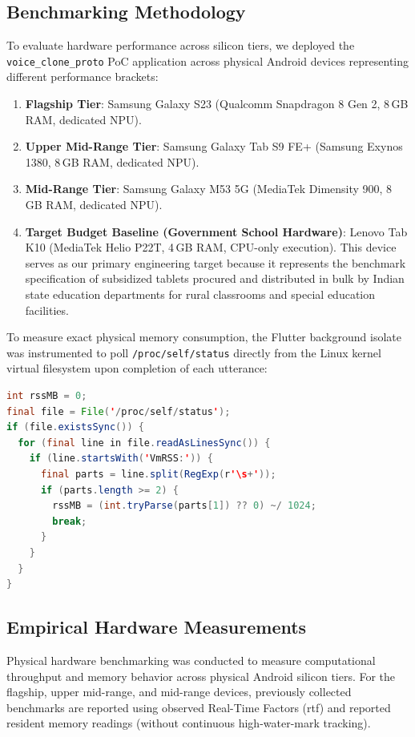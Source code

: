 \subsection{Benchmarking Methodology}
To evaluate hardware performance across silicon tiers, we deployed the \texttt{voice\_clone\_proto} PoC application across physical Android devices representing different performance brackets:
\begin{enumerate}
    \item \textbf{Flagship Tier}: Samsung Galaxy S23 (Qualcomm Snapdragon 8 Gen 2, 8\,GB RAM, dedicated NPU).
    \item \textbf{Upper Mid-Range Tier}: Samsung Galaxy Tab S9 FE+ (Samsung Exynos 1380, 8\,GB RAM, dedicated NPU).
    \item \textbf{Mid-Range Tier}: Samsung Galaxy M53 5G (MediaTek Dimensity 900, 8\,GB RAM, dedicated NPU).
    \item \textbf{Target Budget Baseline (Government School Hardware)}: Lenovo Tab K10 (MediaTek Helio P22T, 4\,GB RAM, CPU-only execution). This device serves as our primary engineering target because it represents the benchmark specification of subsidized tablets procured and distributed in bulk by Indian state education departments for rural classrooms and special education facilities.
\end{enumerate}

To measure exact physical memory consumption, the Flutter background isolate was instrumented to poll \texttt{/proc/self/status} directly from the Linux kernel virtual filesystem upon completion of each utterance:
\begin{lstlisting}[language=Java,caption={Dart In-Kernel Memory Profiling Hook via /proc/self/status}]
int rssMB = 0;
final file = File('/proc/self/status');
if (file.existsSync()) {
  for (final line in file.readAsLinesSync()) {
    if (line.startsWith('VmRSS:')) {
      final parts = line.split(RegExp(r'\s+'));
      if (parts.length >= 2) {
        rssMB = (int.tryParse(parts[1]) ?? 0) ~/ 1024;
        break;
      }
    }
  }
}
\end{lstlisting}

\subsection{Empirical Hardware Measurements}
Physical hardware benchmarking was conducted to measure computational throughput and memory behavior across physical Android silicon tiers. For the flagship, upper mid-range, and mid-range devices, previously collected benchmarks are reported using observed Real-Time Factors (\acrshort{rtf}) and reported resident memory readings (without continuous high-water-mark tracking).

